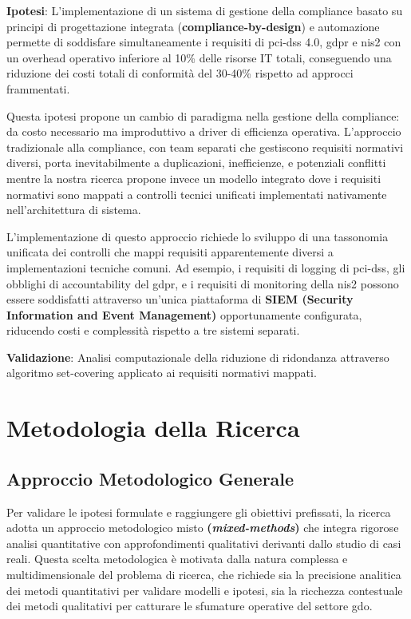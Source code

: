 \label{ssec:h3}
\textbf{Ipotesi}: L'implementazione di un sistema di gestione della compliance basato su principi di progettazione integrata (\textbf{\gls{compliance-by-design}}) e automazione permette di soddisfare simultaneamente i requisiti di \gls{pci-dss} 4.0, \gls{gdpr} e \gls{nis2} con un overhead operativo inferiore al 10\% delle risorse IT totali, conseguendo una riduzione dei costi totali di conformità del 30-40\% rispetto ad approcci frammentati.

Questa ipotesi propone un cambio di paradigma nella gestione della compliance: da costo necessario ma improduttivo a driver di efficienza operativa. L'approccio tradizionale alla compliance, con team separati che gestiscono requisiti normativi diversi, porta inevitabilmente a duplicazioni, inefficienze, e potenziali conflitti mentre la nostra ricerca propone invece un modello integrato dove i requisiti normativi sono mappati a controlli tecnici unificati implementati nativamente nell'architettura di sistema.

L'implementazione di questo approccio richiede lo sviluppo di una tassonomia unificata dei controlli che mappi requisiti apparentemente diversi a implementazioni tecniche comuni. Ad esempio, i requisiti di logging di \gls{pci-dss}, gli obblighi di accountability del \gls{gdpr}, e i requisiti di monitoring della \gls{nis2} possono essere soddisfatti attraverso un'unica piattaforma di \textbf{SIEM (Security Information and Event Management)} opportunamente configurata, riducendo costi e complessità rispetto a tre sistemi separati.

\textbf{Validazione}: Analisi computazionale della riduzione di ridondanza attraverso algoritmo set-covering applicato ai requisiti normativi mappati.

\section{Metodologia della Ricerca}
\label{sec:metodologia}

\subsection{Approccio Metodologico Generale}
\label{ssec:approccio_metodologico}

Per validare le ipotesi formulate e raggiungere gli obiettivi prefissati, la ricerca adotta un approccio metodologico misto \textbf{(\textit{mixed-methods})} che integra rigorose analisi quantitative con approfondimenti qualitativi derivanti dallo studio di casi reali. Questa scelta metodologica è motivata dalla natura complessa e multidimensionale del problema di ricerca, che richiede sia la precisione analitica dei metodi quantitativi per validare modelli e ipotesi, sia la ricchezza contestuale dei metodi qualitativi per catturare le sfumature operative del settore \gls{gdo}.

